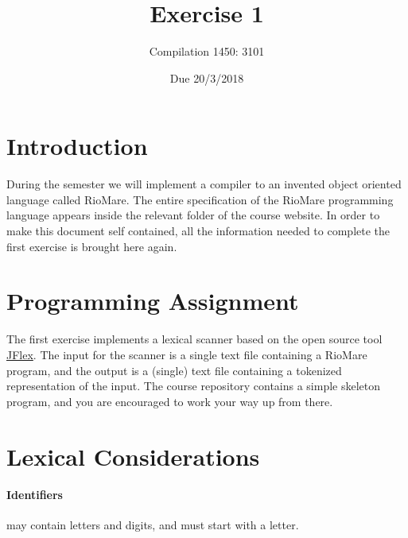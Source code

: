\documentclass{article}
\begin{document}
\title{Exercise 1}

\author{Compilation 1450: 	3101}

\date{Due 20/3/2018}

\maketitle

\section{Introduction}
During the semester we will implement a compiler to an invented
object oriented language called RioMare.
The entire specification of the RioMare programming language
appears inside the relevant folder of the course website.
In order to make this document self contained,
all the information needed to complete the first exercise is brought here again.

\section{Programming Assignment}
The first exercise implements a lexical scanner based on the
open source tool \href{http://jflex.de/}{JFlex}.
The input for the scanner is a single text file containing a RioMare program,
and the output is a (single) text file containing a tokenized representation of the input.
The course repository contains a simple skeleton program,
and you are encouraged to work your way up from there.

\section{Lexical Considerations}
\paragraph{Identifiers} may contain letters and digits, and must start with a letter.
\end{document}
